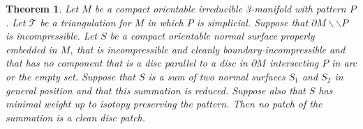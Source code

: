 \documentclass[oneside]{amsart}
\numberwithin{equation}{section}
\theoremstyle{plain}
\newtheorem{theorem}[equation]{Theorem}
\theoremstyle{definition}
\newcommand{\cut}{\backslash\backslash}
\begin{document}
\begin{theorem}
\label{Thm:NoCleanDiscPatches}
Let $M$ be a compact orientable irreducible 3-manifold with pattern $P$. Let $\mathcal{T}$ be
a triangulation for $M$ in which $P$ is simplicial. Suppose that $\partial M \cut P$ is incompressible.
Let $S$ be a compact orientable normal surface properly embedded in $M$, that is incompressible
and cleanly boundary-incompressible and that has no component that is a disc parallel to a
disc in $\partial M$ intersecting $P$ in arc or the empty set. Suppose that $S$ is a sum of
two normal surfaces $S_1$ and $S_2$ in general position and that this summation is reduced.
Suppose also that $S$ has minimal weight up to isotopy preserving the pattern. Then 
no patch of the summation is a clean disc patch.
\end{theorem}
\end{document}
